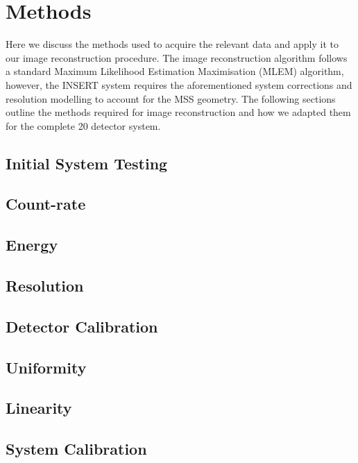 \section{Methods}
Here we discuss the methods used to acquire the relevant
data and apply it to our image reconstruction procedure.
The image reconstruction algorithm follows a standard
Maximum Likelihood Estimation Maximisation (MLEM) algorithm,
however, the INSERT system requires the aforementioned
system corrections and resolution modelling to account for the MSS geometry. The following sections outline
the methods required for image reconstruction and how we
adapted them for the complete 20 detector system.

\subsection{Initial System Testing}
\subsection{Count-rate} 
\subsection{Energy}
\subsection{Resolution}
\subsection{Detector Calibration}
\subsection{Uniformity}


\subsection{Linearity} 
\subsection{System Calibration}
